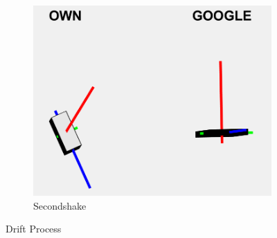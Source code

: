 \begin{figure}[H]
\begin{subfigure}[H]{0.3\textwidth}
        \includegraphics[width=\textwidth]{images/drift2.png}
        \caption{Secondshake}
        \label{fig:drift2}
    \end{subfigure}
    \caption{Drift Process}
    \label{fig:drift-process}
\end{figure}



